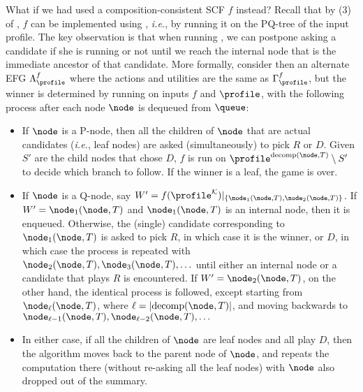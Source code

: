 What if we had used a composition-consistent SCF $f$ instead? Recall that by (3) of , $f$ can be implemented using , \emph{i.e.}, by running it on the PQ-tree of the input profile. The key observation is that when running , we can postpone asking a candidate if she is running or not until we reach the internal node that is the immediate ancestor of that candidate. More formally, consider then an alternate EFG $\Lambda^f_{\profile}$ where the actions and utilities are the same as  $\Gamma^f_{\profile}$, but the winner is determined by running  on inputs $f$ and $\profile$, with the following process after each node $\node$ is dequeued from $\queue$:
\begin{itemize}
    \item If $\node$ is a P-node, then all the children of $\node$ that are actual candidates (\emph{i.e.}, leaf nodes) are asked (simultaneously) to pick $R$ or $D$. Given $S'$ are the child nodes that chose $D$, $f$ is run on $\profile^{\text{decomp}(\node,T)}\setminus S'$ to decide which branch to follow. If the winner is a leaf, the game is over. 
    \item If $\node$ is a Q-node, say $W'=f(\profile^\mathcal{K})|_{\{\node_1(\node,T),\node_2(\node,T)\}}$. If $W'=\node_1(\node,T)$ and $\node_1(\node,T)$ is an internal node, then it is enqueued. Otherwise, the (single) candidate corresponding to $\node_1(\node,T)$ is asked to pick $R$, in which case it is the winner, or $D$, in which case the process is repeated with $\node_2(\node,T), \node_3(\node,T),\ldots$ until either an internal node or a candidate that plays $R$ is encountered. If $W'=\node_2(\node,T)$, on the other hand, the identical process is followed, except starting from $\node_\ell(\node,T)$, where $\ell=|\text{decomp}(\node,T)|$, and moving backwards to $\node_{\ell-1}(\node,T),\node_{\ell-2}(\node,T),\ldots$
    
    \item In either case, if all the children of $\node$ are leaf nodes and all play $D$, then the algorithm moves back to the parent node of $\node$, and repeats the computation there (without re-asking all the leaf nodes) with $\node$ also dropped out of the summary.
\end{itemize}

